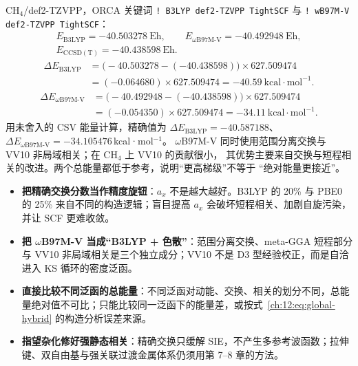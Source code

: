 \begin{ch4box}
CH$_4$/def2-TZVPP，ORCA 关键词 \texttt{! B3LYP def2-TZVPP TightSCF} 与
\texttt{! wB97M-V def2-TZVPP TightSCF}：
\[
\begin{gathered}
E_{\mathrm{B3LYP}} = -40.503278\ \mathrm{Eh},\qquad
E_{\omega\mathrm{B97M\text{-}V}} = -40.492948\ \mathrm{Eh},\\
E_{\mathrm{CCSD(T)}} = -40.438598\ \mathrm{Eh}.
\end{gathered}
\]
\[
\begin{aligned}
\Delta E_{\mathrm{B3LYP}}
&= \big(-40.503278 -(-40.438598)\big)\times 627.509474\\
&= (-0.064680)\times 627.509474
= -40.59\ \mathrm{kcal\cdot mol^{-1}}.
\end{aligned}
\]
\[
\begin{aligned}
\Delta E_{\omega\mathrm{B97M\text{-}V}}
&= \big(-40.492948 -(-40.438598)\big)\times 627.509474\\
&= (-0.054350)\times 627.509474
= -34.11\ \mathrm{kcal\cdot mol^{-1}}.
\end{aligned}
\]
用未舍入的 CSV 能量计算，精确值为 $\Delta E_{\mathrm{B3LYP}}=-40.587188$、
$\Delta E_{\omega\mathrm{B97M\text{-}V}}=-34.105476$\,kcal·mol$^{-1}$。
$\omega$B97M-V 同时使用范围分离交换与 VV10 非局域相关；在 CH$_4$ 上 VV10 的贡献很小，
其优势主要来自交换与短程相关的改进。两个总能量都低于参考，说明“更高梯级”不等于
“绝对能量更接近”。
\end{ch4box}

\begin{pitfall}
\begin{itemize}
  \item \textbf{把精确交换分数当作精度旋钮}：$a_x$ 不是越大越好。B3LYP 的 20\% 与 PBE0 的 25\% 来自不同的构造逻辑；盲目提高 $a_x$ 会破坏短程相关、加剧自旋污染，并让 SCF 更难收敛。
  \item \textbf{把 $\omega$B97M-V 当成“B3LYP + 色散”}：范围分离交换、meta-GGA 短程部分与 VV10 非局域相关是三个独立成分；VV10 不是 D3 型经验校正，而是自洽进入 KS 循环的密度泛函。
  \item \textbf{直接比较不同泛函的总能量}：不同泛函对动能、交换、相关的划分不同，总能量绝对值不可比；只能比较同一泛函下的能量差，或按式~\eqref{ch:12:eq:global-hybrid} 的构造分析误差来源。
  \item \textbf{指望杂化修好强静态相关}：精确交换只缓解 SIE，不产生多参考波函数；拉伸键、双自由基与强关联过渡金属体系仍须用第 7--8 章的方法。
\end{itemize}
\end{pitfall}

